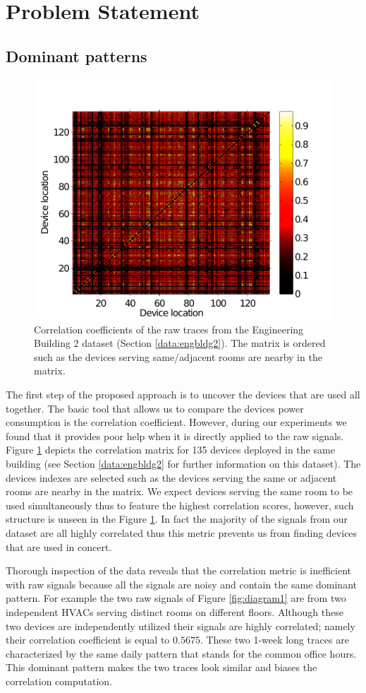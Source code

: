 \section{Problem Statement}
\subsection{Dominant patterns}
\begin{figure}
\includegraphics[width=.48\textwidth]{img/heatMap_raw_201106-eps-converted-to.pdf}
\caption{Correlation coefficients of the raw traces from the Engineering Building 2 dataset (Section \ref{data:engbldg2}).
The matrix is ordered such as the devices serving same/adjacent rooms are nearby in the matrix.}
\label{fig:heatmap:raw}
\end{figure}

The first step of the proposed approach is to uncover the devices that are used all together.
The basic tool that allows us to compare the devices power consumption is the correlation coefficient.
However, during our experiments we found that it provides poor help when it is directly applied to the raw signals.
Figure \ref{fig:heatmap:raw} depicts the correlation matrix for 135 devices deployed in the same building (see Section \ref{data:engbldg2} for further information on this dataset).
The devices indexes are selected such as the devices serving the same or adjacent rooms are nearby in the matrix.
We expect devices serving the same room to be used simultaneously thus to feature the highest correlation scores, however, such structure is unseen in the Figure \ref{fig:heatmap:raw}.
In fact the majority of the signals from our dataset are all highly correlated thus this metric prevents us from finding devices that are used in concert.

Thorough inspection of the data reveals that the correlation metric is inefficient with raw signals because all the signals are noisy and contain the same dominant pattern.
For example the two raw signals of Figure \ref{fig:diagram1} are from two independent HVACs serving distinct rooms on different floors.
Although these two devices are independently utilized their signals are highly correlated; namely their correlation coefficient is equal to $0.5675$.
These two 1-week long traces are characterized by the same daily pattern that stands for the common office hours.
This dominant pattern makes the two traces look similar and biases the correlation computation.

